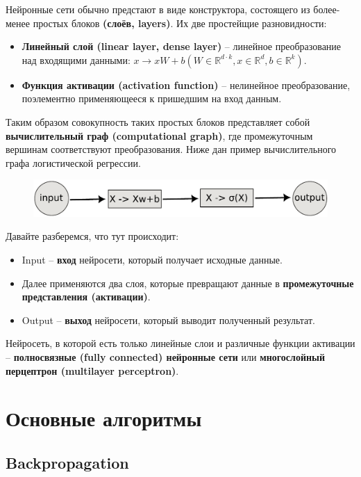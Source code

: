 \documentclass[a4paper, 10pt, openany]{book} %
\begin{document}
	Нейронные сети обычно предстают в виде конструктора, состоящего из более-менее простых блоков \textbf{(слоёв, layers)}. Их две простейщие разновидности:
	\begin{itemize}
	    \item \textbf{Линейный слой (linear layer, dense layer)} -- линейное преобразование над входящими данными: $x \rightarrow xW + b (W \in \mathbb{R}^{d \cdot k}, x \in \mathbb{R}^d, b \in \mathbb{R}^k)$.
	    \item \textbf{Функция активации (activation function)} -- нелинейное преобразование, поэлементно применяющееся к пришедшим на вход данным.
	\end{itemize}
	Таким образом совокупность таких простых блоков представляет собой \textbf{вычислительный граф (computational graph)}, где промежуточным вершинам соответствуют преобразования. Ниже дан пример вычислительного графа логистической регрессии.
	\begin{figure}[h!]
		\centering
		\includegraphics[width=\linewidth]{pictures/deep_learning/logistics_network.pdf}
	\end{figure}
	Давайте разберемся, что тут происходит:
	\begin{itemize}
	    \item Input -- \textbf{вход} нейросети, который получает исходные данные.
	    \item Далее применяются два слоя, которые превращают данные в \textbf{промежуточные представления (активации)}.
	    \item Output -- \textbf{выход} нейросети, который выводит полученный результат.
	\end{itemize}
	Нейросеть, в которой есть только линейные слои и различные функции активации -- \textbf{полносвязные (fully connected) нейронные сети} или \textbf{многослойный перцептрон (multilayer perceptron)}.
	
	\chapter{Основные алгоритмы}
	
	\section{Backpropagation}
	
\end{document}
